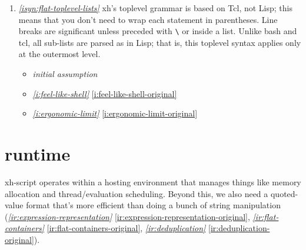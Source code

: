 \documentclass{report}
\makeatletter
\newcommand*{\Label}[2]{%
  \@bsphack
  \begingroup
    \label{#1-original}%
    \def\@currentlabel{#2}%
    \label{#1}%
  \endgroup
  \@esphack
}
\newcommand{\initial}{{\em initial assumption}}
\newcommand{\refboth}[1]{{\em \ref{#1}} \ref{#1-original}}
\makeatother
\begin{document}
\begin{enumerate}
\item{}\Label{isyn:flat-toplevel-lists}{syn.flattoplevel}{\em\ref{isyn:flat-toplevel-lists}}
  xh's toplevel grammar is based on Tcl, not Lisp; this means that you
  don't need to wrap each statement in parentheses. Line breaks are
  significant unless preceded with {\tt \textbackslash} or inside a list.
  Unlike bash and tcl, all sub-lists are parsed as in Lisp; that is, this
  toplevel syntax applies only at the outermost level.
\begin{itemize}
\item \initial
\item \refboth{i:feel-like-shell}
\item \refboth{i:ergonomic-limit}
\end{itemize}

\end{enumerate}

\chapter{runtime}\label{chp:runtime}
  xh-script operates within a hosting environment that manages things like
  memory allocation and thread/evaluation scheduling. Beyond this, we also need
  a quoted-value format that's more efficient than doing a bunch of string
  manipulation (\refboth{ir:expression-representation},
  \refboth{ir:flat-containers}, \refboth{ir:deduplication}).
\end{document}
